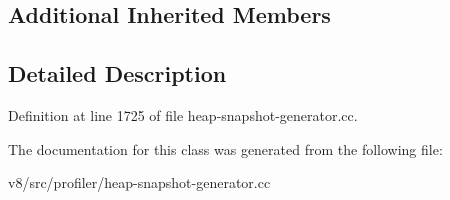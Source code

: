 \subsection*{Additional Inherited Members}


\subsection{Detailed Description}


Definition at line 1725 of file heap-\/snapshot-\/generator.\+cc.



The documentation for this class was generated from the following file\+:\begin{DoxyCompactItemize}
\item 
v8/src/profiler/heap-\/snapshot-\/generator.\+cc\end{DoxyCompactItemize}
